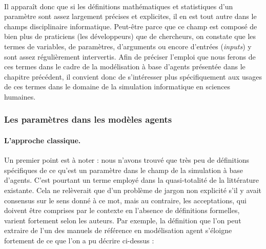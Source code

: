 \paragraph*{} Il apparaît donc que si les définitions mathématiques et statistiques d'un paramètre sont assez largement précises et explicites, il en est tout autre dans le champs disciplinaire informatique.
Peut-être parce que ce champ est composé de bien plus de praticiens (les développeurs) que de chercheurs, on constate que les termes de variables, de paramètres, d'arguments ou encore d'entrées (\textit{inputs}) y sont assez régulièrement intervertis.
Afin de préciser l'emploi que nous ferons de ces termes dans le cadre de la modélisation à base d'agents présentée dans le chapitre précédent, il convient donc de s'intéresser plus spécifiquement aux usages de ces termes dans le domaine de la simulation informatique en sciences humaines.

\clearpage
\subsubsection{Les paramètres dans les modèles agents}

\paragraph{L'approche classique.}
Un premier point est à noter : nous n'avons trouvé que très peu de définitions spécifiques de ce qu'est un paramètre dans le champ de la simulation à base d'agents.
C'est pourtant un terme employé dans la quasi-totalité de la littérature existante.
Cela ne relèverait que d'un problème de jargon non explicité s'il y avait consensus sur le sens donné à ce mot, mais au contraire, les acceptations, qui doivent être comprises par le contexte en l'absence de définitions formelles, varient fortement selon les auteurs.
Par exemple, la définition que l'on peut extraire de l'un des manuels de référence en modélisation agent \autocite{treuil_modelisation_2008} s'éloigne fortement de ce que l'on a pu décrire ci-dessus :

